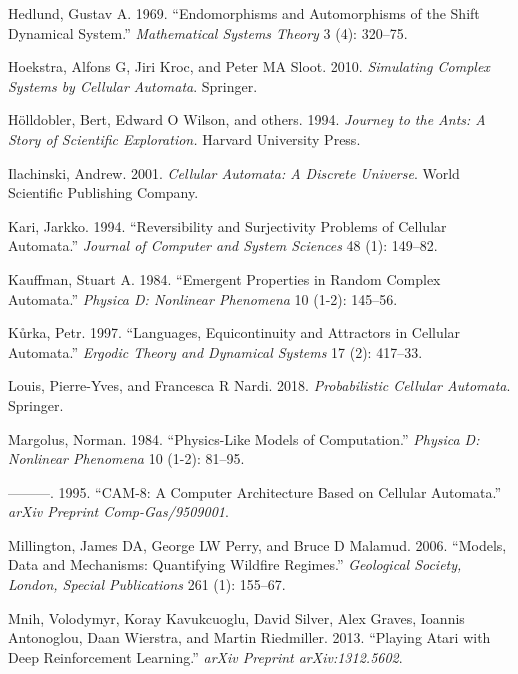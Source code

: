 \documentclass[
]{book}
\newlength{\cslhangindent}
\newenvironment{cslreferences}%
  {\setlength{\parindent}{0pt}%
  \everypar{\setlength{\hangindent}{\cslhangindent}}\ignorespaces}%
  {\par}
\begin{document}
\begin{cslreferences}
\leavevmode\hypertarget{ref-hedlund1969endomorphisms}{}%
Hedlund, Gustav A. 1969. ``Endomorphisms and Automorphisms of the Shift Dynamical System.'' \emph{Mathematical Systems Theory} 3 (4): 320--75.

\leavevmode\hypertarget{ref-hoekstra2010simulating}{}%
Hoekstra, Alfons G, Jiri Kroc, and Peter MA Sloot. 2010. \emph{Simulating Complex Systems by Cellular Automata}. Springer.

\leavevmode\hypertarget{ref-holldobler1994journey}{}%
Hölldobler, Bert, Edward O Wilson, and others. 1994. \emph{Journey to the Ants: A Story of Scientific Exploration.} Harvard University Press.

\leavevmode\hypertarget{ref-ilachinski2001cellular}{}%
Ilachinski, Andrew. 2001. \emph{Cellular Automata: A Discrete Universe}. World Scientific Publishing Company.

\leavevmode\hypertarget{ref-kari1994reversibility}{}%
Kari, Jarkko. 1994. ``Reversibility and Surjectivity Problems of Cellular Automata.'' \emph{Journal of Computer and System Sciences} 48 (1): 149--82.

\leavevmode\hypertarget{ref-kauffman1984emergent}{}%
Kauffman, Stuart A. 1984. ``Emergent Properties in Random Complex Automata.'' \emph{Physica D: Nonlinear Phenomena} 10 (1-2): 145--56.

\leavevmode\hypertarget{ref-kuurka1997languages}{}%
Kůrka, Petr. 1997. ``Languages, Equicontinuity and Attractors in Cellular Automata.'' \emph{Ergodic Theory and Dynamical Systems} 17 (2): 417--33.

\leavevmode\hypertarget{ref-louis2018probabilistic}{}%
Louis, Pierre-Yves, and Francesca R Nardi. 2018. \emph{Probabilistic Cellular Automata}. Springer.

\leavevmode\hypertarget{ref-margolus1984physics}{}%
Margolus, Norman. 1984. ``Physics-Like Models of Computation.'' \emph{Physica D: Nonlinear Phenomena} 10 (1-2): 81--95.

\leavevmode\hypertarget{ref-margolus1995cam}{}%
---------. 1995. ``CAM-8: A Computer Architecture Based on Cellular Automata.'' \emph{arXiv Preprint Comp-Gas/9509001}.

\leavevmode\hypertarget{ref-millington2006models}{}%
Millington, James DA, George LW Perry, and Bruce D Malamud. 2006. ``Models, Data and Mechanisms: Quantifying Wildfire Regimes.'' \emph{Geological Society, London, Special Publications} 261 (1): 155--67.

\leavevmode\hypertarget{ref-mnih2013playing}{}%
Mnih, Volodymyr, Koray Kavukcuoglu, David Silver, Alex Graves, Ioannis Antonoglou, Daan Wierstra, and Martin Riedmiller. 2013. ``Playing Atari with Deep Reinforcement Learning.'' \emph{arXiv Preprint arXiv:1312.5602}.


\end{cslreferences}
\end{document}
